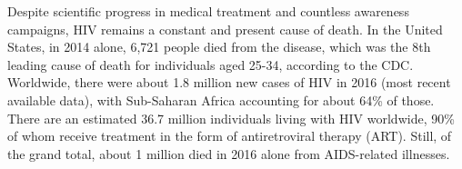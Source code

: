 \begin{figure}[H]
\end{figure}
\clearpage
\begin{figure}
\end{figure}
Despite scientific progress in medical treatment and countless awareness campaigns, HIV remains a constant and present cause of death. In the United States, in 2014 alone, 6,721 people died from the disease, which was the 8th leading cause of death for individuals aged 25-34, according to the CDC. Worldwide, there were about 1.8 million new cases of HIV in 2016 (most recent available data), with Sub-Saharan Africa accounting for about 64\% of those. There are an estimated 36.7 million individuals living with HIV worldwide, 90\% of whom receive treatment in the form of antiretroviral therapy (ART). Still, of the grand total, about 1 million died in 2016 alone from AIDS-related illnesses.\\

